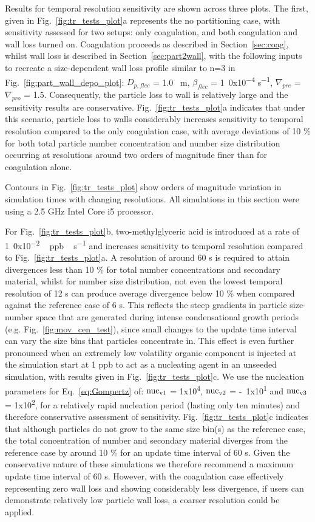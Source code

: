 \documentclass[gmd, manuscript]{copernicus}
\begin{document}
Results for temporal resolution sensitivity are shown across three plots.  The first, given in Fig.~\ref{fig:tr_tests_plot}a represents the no partitioning case, with sensitivity assessed for two setups: only coagulation, and both coagulation and wall loss turned on.  Coagulation proceeds as described in Section~\ref{sec:coag}, whilst wall loss is described in Section~\ref{sec:part2wall}, with the following inputs to recreate a size-dependent wall loss profile similar to n=3 in Fig.~\ref{fig:part_wall_depo_plot}: $D_{p,flec}$ = 1.0 \unit{\mu m}, $\beta_{flec}$ = \unit{1.0x10^{-4}} \unit{s^{-1}}, $\nabla_{pre}$ = $\nabla_{pro}$ = 1.5.  Consequently, the particle loss to wall is relatively large and the sensitivity results are conservative.  Fig.~\ref{fig:tr_tests_plot}a indicates that under this scenario, particle loss to walls considerably increases sensitivity to temporal resolution compared to the only coagulation case, with average deviations of 10 \% for both total particle number concentration and number size distribution occurring at resolutions around two orders of magnitude finer than for coagulation alone.

Contours in Fig.~\ref{fig:tr_tests_plot} show orders of magnitude variation in simulation times with changing resolutions.  All simulations in this section were using a 2.5 GHz Intel Core i5 processor.

For Fig.~\ref{fig:tr_tests_plot}b, two-methylglyceric acid is introduced at a rate of \unit{1.0x10^{-2}\, ppb \, s^{-1}} and increases sensitivity to temporal resolution compared to Fig.~\ref{fig:tr_tests_plot}a.  A resolution of around 60 s is required to attain divergences less than 10 \% for total number concentrations and secondary material, whilst for number size distribution, not even the lowest temporal resolution of 12 s can produce average divergence below 10 \% when compared against the reference case of 6 s.  This reflects the steep gradients in particle size-number space that are generated during intense condensational growth periods (e.g. Fig.~\ref{fig:mov_cen_test}), since small changes to the update time interval can vary the size bins that particles concentrate in.  This effect is even further pronounced when an extremely low volatility organic component is injected at the simulation start at 1 ppb to act as a nucleating agent in an unseeded simulation, with results given in Fig.~\ref{fig:tr_tests_plot}c.  We use the nucleation parameters for Eq.~\ref{eq:Gompertz} of: $\rm{nuc_{v1}}$ = \unit{1x10^4}, $\rm{nuc_{v2}}$ = \unit{-1x10^{1}} and $\rm{nuc_{v3}}$ = \unit{1x10^{2}}, for a relatively rapid nucleation period (lasting only ten minutes) and therefore conservative assessment of sensitivity.  Fig.~\ref{fig:tr_tests_plot}c indicates that although particles do not grow to the same size bin(s) as the reference case, the total concentration of number and secondary material diverges from the reference case by around 10 \% for an update time interval of 60 s.  Given the conservative nature of these simulations we therefore recommend a maximum update time interval of 60 s.  However, with the coagulation case effectively representing zero wall loss and showing considerably less divergence, if users can demonstrate relatively low particle wall loss, a coarser resolution could be applied.
\end{document}

